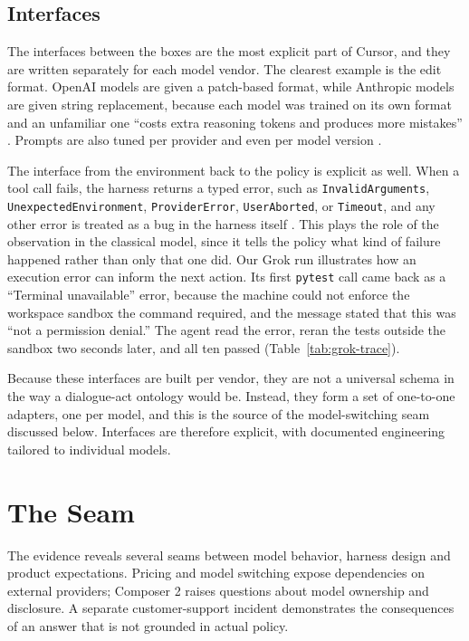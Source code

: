 \documentclass[11pt]{article}
\begin{document}
\subsection{Interfaces}

The interfaces between the boxes are the most explicit part of Cursor, and they are written separately for each model vendor. The clearest example is the edit format. OpenAI models are given a patch-based format, while Anthropic models are given string replacement, because each model was trained on its own format and an unfamiliar one ``costs extra reasoning tokens and produces more mistakes'' \citep{heule2026harness}. Prompts are also tuned per provider and even per model version \citep{heule2026harness}.

The interface from the environment back to the policy is explicit as well. When a tool call fails, the harness returns a typed error, such as \texttt{InvalidArguments}, \texttt{UnexpectedEnvironment}, \texttt{ProviderError}, \texttt{UserAborted}, or \texttt{Timeout}, and any other error is treated as a bug in the harness itself \citep{heule2026harness}. This plays the role of the observation in the classical model, since it tells the policy what kind of failure happened rather than only that one did. Our Grok run illustrates how an execution error can inform the next action. Its first \texttt{pytest} call came back as a ``Terminal unavailable'' error, because the machine could not enforce the workspace sandbox the command required, and the message stated that this was ``not a permission denial.'' The agent read the error, reran the tests outside the sandbox two seconds later, and all ten passed (Table~\ref{tab:grok-trace}).

Because these interfaces are built per vendor, they are not a universal schema in the way a dialogue-act ontology would be. Instead, they form a set of one-to-one adapters, one per model, and this is the source of the model-switching seam discussed below. Interfaces are therefore explicit, with documented engineering tailored to individual models.



\section{The Seam}

The evidence reveals several seams between model behavior, harness design and product expectations. Pricing and model switching expose dependencies on external providers; Composer 2 raises questions about model ownership and disclosure. A separate customer-support incident demonstrates the consequences of an answer that is not grounded in actual policy.
\end{document}
